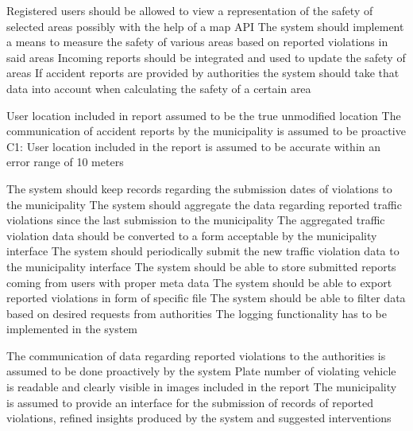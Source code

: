 \textbf{}

\begin{itemize}

\require Registered users should be allowed to view a representation of the safety of selected areas possibly with the help of a map API
\require The system should implement a means to measure the safety of various areas based on reported violations in said areas
\require Incoming reports should be integrated and used to update the safety of areas 
\require If accident reports are provided by authorities the system should take that data into account when calculating the safety of a certain area

\end{itemize}

\begin{itemize}

\domain User location included in report assumed to be the true unmodified location
\domain The communication of accident reports by the municipality is assumed to be proactive
C1: User location included in the report is assumed to be accurate within an error range of 10 meters
\end{itemize}

\textbf{}

\begin{itemize}

\require The system should keep records regarding the submission dates of violations to the municipality
\require The system should aggregate the data regarding reported traffic violations since the last submission to the municipality
\require The aggregated traffic violation data should be converted to a form acceptable by the municipality interface
\require The system should periodically submit the new traffic violation data to the municipality interface
\require The system should be able to store submitted reports coming from users with proper meta data
\require The system should be able to export reported violations in form of specific file
\require The system should be able to filter data based on desired requests from authorities
\require The logging functionality has to be implemented in the system
\end{itemize}

\begin{itemize}

\domain The communication of data regarding reported violations to the authorities is assumed to be done proactively by the system
\domain Plate number of violating vehicle is readable and clearly visible in images included in the report
\domain The municipality is assumed to provide an interface for the submission of records of reported violations, refined insights produced by the system and suggested interventions
\end{itemize}

